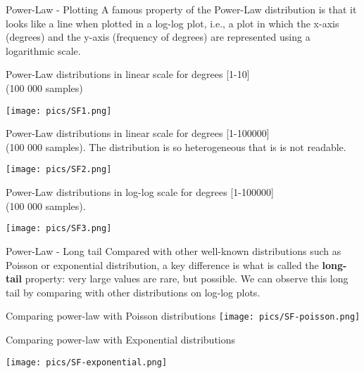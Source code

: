 \begin{textbox}{Power-Law - Plotting}
    A famous property of the Power-Law distribution is that it looks like a line when plotted in a log-log plot, i.e., a plot in which the x-axis (degrees) and the y-axis (frequency of degrees) are represented using a logarithmic scale.
    \begin{center}
        Power-Law distributions in linear scale for degrees [1-10] \\
        (100 000 samples)

        \texttt{[image: pics/SF1.png]}

        Power-Law distributions in linear scale for degrees [1-100000] \\
        (100 000 samples). The distribution is so heterogeneous that is is not readable.

        \texttt{[image: pics/SF2.png]}

        Power-Law distributions in log-log scale for degrees [1-100000] \\
        (100 000 samples).

        \texttt{[image: pics/SF3.png]}
    \end{center}
\end{textbox}


\begin{textbox}{Power-Law - Long tail}
    Compared with other well-known distributions such as Poisson or exponential distribution, a key difference is what is called the \textbf{long-tail} property: very large values are rare, but possible. We can observe this long tail by comparing with other distributions on log-log plots.

    \begin{center}
        Comparing power-law with Poisson distributions
        \texttt{[image: pics/SF-poisson.png]}

        Comparing power-law with Exponential distributions


        \texttt{[image: pics/SF-exponential.png]}

    \end{center}
\end{textbox}

